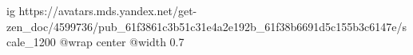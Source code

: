 
 
 
 
 

\ifcmt
  ig https://avatars.mds.yandex.net/get-zen_doc/4599736/pub_61f3861c3b51c31e4a2e192b_61f38b6691d5c155b3c6147e/scale_1200
	@wrap center
	@width 0.7
\fi
